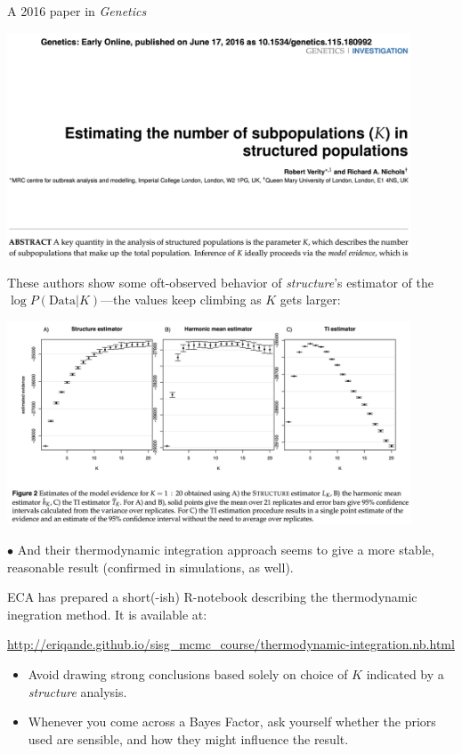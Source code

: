 


A 2016 paper in {\em Genetics}
\begin{center}
\includegraphics[width = 0.9\textwidth]{illus/verity.png}
\end{center}
\newpage

These authors show some oft-observed behavior of {\em structure}'s estimator of the $\log P(\mathrm{Data} | K)$---the values keep climbing as $K$ gets larger:
\begin{center}
\includegraphics[width = 0.9\textwidth]{illus/verity2.png}
\end{center}
$\bullet$ And their thermodynamic integration approach seems to give a more stable, reasonable 
result (confirmed in simulations, as well).

\newpage
ECA has prepared a short(-ish) R-notebook describing the thermodynamic inegration method.  It is available at:

{\tiny
\url{http://eriqande.github.io/sisg_mcmc_course/thermodynamic-integration.nb.html}
}


\begin{itemize}
\item Avoid drawing strong conclusions based solely on
choice of $K$ indicated by a {\sl structure} analysis.
\item Whenever you come across a Bayes Factor, ask yourself whether the priors
used are sensible, and how they might influence the result.
\end{itemize}


